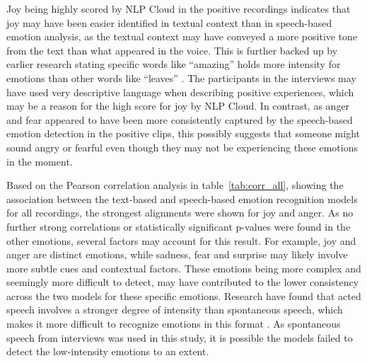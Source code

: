 Joy being highly scored by NLP Cloud in the positive recordings indicates that joy may have been easier identified in textual context than in speech-based emotion analysis, as the textual context may have conveyed a more positive tone from the text than what appeared in the voice. This is further backed up by earlier research stating specific words like “amazing” holds more intensity for emotions than other words like “leaves” \autocite{Chauhan2024}. The participants in the interviews may have used very descriptive language when describing positive experiences, which may be a reason for the high score for joy by NLP Cloud.
In contrast, as anger and fear appeared to have been more consistently captured by the speech-based emotion detection in the positive clips, this possibly suggests that someone might sound angry or fearful even though they may not be experiencing these emotions in the moment.

Based on the Pearson correlation analysis in table~\ref{tab:corr_all}, showing the association between the text-based and speech-based emotion recognition models for all recordings, the strongest alignments were shown for joy and anger. As no further strong correlations or statistically significant p-values were found in the other emotions, several factors may account for this result. For example, joy and anger are distinct emotions, while sadness, fear and surprise may likely involve more subtle cues and contextual factors. These emotions being more complex and seemingly more difficult to detect, may have contributed to the lower consistency across the two models for these specific emotions. Research have found that acted speech involves a stronger degree of intensity than spontaneous speech, which makes it more difficult to recognize emotions in this format \autocite{Chakraborty2016}. As spontaneous speech from interviews was used in this study, it is possible the models failed to detect the low-intensity emotions to an extent.

